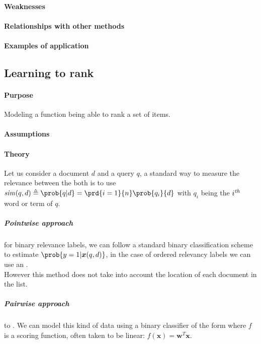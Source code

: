 \paragraph{Weaknesses}
\paragraph{Relationships with other methods}
\paragraph{Examples of application}


\subsection{Learning to rank}
\paragraph{Purpose}
Modeling a function being able to rank a set of items.



\paragraph{Assumptions}
\paragraph{Theory}
Let us consider a document $d$ and a query $q$, a standard way to measure the relevance
between the both is to use $\text{\emph{sim}}(q,d) \triangleq \prob{q|d} = \prd{i=1}{n}
\prob{q_{i}}{d}$ with $q_{i}$ being the $i^{\text{\emph{th}}}$ word or term of $q$.
\subparagraph{Pointwise approach}
for binary relevance labels, we can follow a standard binary classification scheme to
estimate $\prob{y=1|\bm{x}(q,d)}$, in the case of ordered relevancy labels we can use
an .\\
However this method does not take into account the location of each document in the 
list.
\subparagraph{Pairwise approach}
to . We 
can model this kind of data using a binary classifier of the form  
where $f$ is a scoring function, often taken to be linear: $f(\bm{x}) = \bm{w}^{T}
\bm{x}$.


